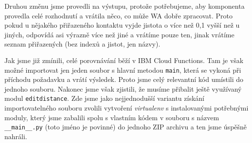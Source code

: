 Druhou změnu jsme provedli na výstupu, protože potřebujeme, aby komponenta provedla
celé rozhodnutí a vrátila něco, co může WA dobře zpracovat. Proto pokud u nějakého
přiřazeného kontaktu vyjde jistota o více než 0,1 vyšší než u jiných, odpovídá asi
výrazně více než jiné a vrátíme pouze
ten, jinak vrátíme seznam přiřazených (bez indexů a jistot, jen názvy).

Jak jsme již zmínili, celé porovnávání běží v IBM Cloud Functions. Tam je však možné
importovat jen jeden soubor s hlavní metodou \texttt{main}, která se vykoná při
příchodu požadavku a vrátí výsledek. Proto jsme celý relevantní kód umístili do
jednoho souboru. Nakonec jsme však zjistili, že musíme přibalit ještě využívaný
modul \texttt{editdistance}. Zde jsme jako nejjednodušší variantu získání importovatelného souboru
zvolili vytvoření \textit{virtualenv} s instalovanými potřebnými moduly,
který jsme zabalili spolu s vlastním kódem v souboru s názvem \texttt{\_\_main\_\_.py}
(toto jméno je povinné) do jednoho ZIP archivu a ten jsme úspěšně nahráli.